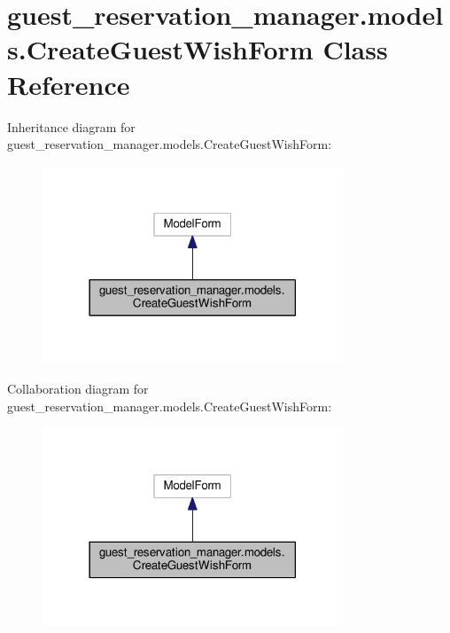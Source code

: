 \hypertarget{classguest__reservation__manager_1_1models_1_1CreateGuestWishForm}{\section{guest\-\_\-reservation\-\_\-manager.\-models.\-Create\-Guest\-Wish\-Form Class Reference}
\label{classguest__reservation__manager_1_1models_1_1CreateGuestWishForm}
}


Inheritance diagram for guest\-\_\-reservation\-\_\-manager.\-models.\-Create\-Guest\-Wish\-Form\-:
\nopagebreak
\begin{figure}[H]
\begin{center}
\leavevmode
\includegraphics[width=254pt]{classguest__reservation__manager_1_1models_1_1CreateGuestWishForm__inherit__graph}
\end{center}
\end{figure}


Collaboration diagram for guest\-\_\-reservation\-\_\-manager.\-models.\-Create\-Guest\-Wish\-Form\-:
\nopagebreak
\begin{figure}[H]
\begin{center}
\leavevmode
\includegraphics[width=254pt]{classguest__reservation__manager_1_1models_1_1CreateGuestWishForm__coll__graph}
\end{center}
\end{figure}
